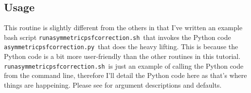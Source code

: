 
\newcommand{\asymshfile}{\texttt{run\textunderscore asymmetric\textunderscore psf\textunderscore correction.sh}}
\newcommand{\asympyfile}{\texttt{asymmetric\textunderscore psf\textunderscore correction.py}}


\subsection{Usage}
 
This routine is slightly different from the others in that I've written an example bash script \asymshfile ~that invokes the Python code \asympyfile ~that does the heavy lifting. This is because the Python code is a bit more user-friendly than the other routines in this tutorial. \asymshfile ~is just an example of calling the Python code from the command line, therefore I'll detail the Python code here as that's where things are happeining. Please see  for argument descriptions and defaults.

